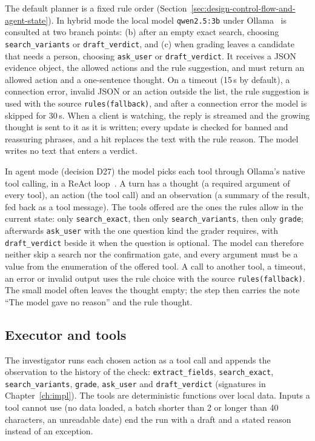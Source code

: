 The default planner is a fixed rule order (Section~\ref{sec:design-control-flow-and-agent-state}).
In hybrid mode the local model \texttt{qwen2.5:3b} under Ollama~\cite{ollama2026structured} is
consulted at two branch points: (b) after an empty exact search, choosing \texttt{search\_variants}
or \texttt{draft\_verdict}, and (c) when grading leaves a candidate that needs a person, choosing
\texttt{ask\_user} or \texttt{draft\_verdict}. It receives a JSON evidence object, the allowed
actions and the rule suggestion, and must return an allowed action and a one-sentence thought. On a
timeout (15\,s by default), a connection error, invalid JSON or an action outside the list, the rule
suggestion is used with the source \texttt{rules(fallback)}, and after a connection error the model
is skipped for 30\,s. When a client is watching, the reply is streamed and the growing thought is sent to
it as it is written; every update is checked for banned and reassuring phrases, and a hit replaces
the text with the rule reason. The model writes no text that enters a verdict.

In agent mode (decision D27) the model picks each tool through Ollama's native tool calling, in a
ReAct loop~\cite{yao2023react}. A turn has a thought (a required argument of every tool), an action (the tool
call) and an observation (a summary of the result, fed back as a tool message). The tools offered are the ones the
rules allow in the current state: only \texttt{search\_exact}, then only \texttt{search\_variants}, then only
\texttt{grade}; afterwards \texttt{ask\_user} with the one question kind the grader requires, with
\texttt{draft\_verdict} beside it when the question is optional. The model can therefore neither skip a search nor the
confirmation gate, and every argument must be a value from the enumeration of the offered tool. A call to another tool,
a timeout, an error or invalid output uses the rule choice with the source \texttt{rules(fallback)}. The small model
often leaves the thought empty; the step then carries the note ``The model gave no reason'' and the rule thought.

\subsection{Executor and tools}

The investigator runs each chosen action as a tool call and appends the observation to the history
of the check: \texttt{extract\_fields}, \texttt{search\_exact}, \texttt{search\_variants},
\texttt{grade}, \texttt{ask\_user} and \texttt{draft\_verdict} (signatures in
Chapter~\ref{ch:impl}). The tools are deterministic functions over local data. Inputs a tool cannot
use (no data loaded, a batch shorter than 2 or longer than 40 characters, an unreadable date) end the
run with a \CANTV{} draft and a stated reason instead of an exception.


